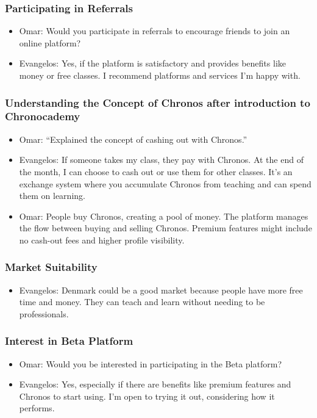 \begin{enumerate}
\subsubsection*{Participating in Referrals}
\begin{itemize}
\item Omar: Would you participate in referrals to encourage friends to join an online platform?
\item Evangelos: Yes, if the platform is satisfactory and provides benefits like money or free classes.
I recommend platforms and services I’m happy with.
\end{itemize}

\subsubsection*{Understanding the Concept of Chronos after introduction to Chronocademy}
\begin{itemize}
\item Omar: “Explained the concept of cashing out with Chronos.”
\item Evangelos: If someone takes my class, they pay with Chronos.
At the end of the month, I can choose to cash out or use them for other classes.
It’s an exchange system where you accumulate Chronos from teaching and can spend them on learning.
\item Omar: People buy Chronos, creating a pool of money.
The platform manages the flow between buying and selling Chronos.
Premium features might include no cash-out fees and higher profile visibility.
\end{itemize}

\subsubsection*{Market Suitability}
\begin{itemize}
\item Evangelos: Denmark could be a good market because people have more free time and money.
They can teach and learn without needing to be professionals.
\end{itemize}

\subsubsection*{Interest in Beta Platform}
\begin{itemize}
\item Omar: Would you be interested in participating in the Beta platform?
\item Evangelos: Yes, especially if there are benefits like premium features and Chronos to start using.
I’m open to trying it out, considering how it performs.
\end{itemize}


\end{enumerate}
